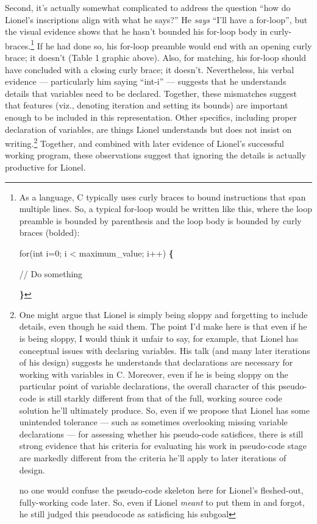 Second, it's actually somewhat complicated to address the question ``how
do Lionel's inscriptions align with what he says?'' He \emph{says}
``I'll have a for-loop'', but the visual evidence shows that he hasn't
bounded his for-loop body in curly-braces.\footnote{As a language, C
  typically uses curly braces to bound instructions that span multiple
  lines. So, a typical for-loop would be written like this, where the
  loop preamble is bounded by parenthesis and the loop body is bounded
  by curly braces (bolded):

  for(int i=0; i \textless{} maximum\_value; i++) \textbf{\{}

  // Do something

  \textbf{\}}} If he had done so, his for-loop preamble would end with
an opening curly brace; it doesn't (Table 1 graphic above). Also, for
matching, his for-loop should have concluded with a closing curly brace;
it doesn't. Nevertheless, his verbal evidence --- particularly him
saying ``int-i'' --- suggests that he understands details that variables
need to be declared. Together, these mismatches suggest that features
(viz., denoting iteration and setting its bounds) are important enough
to be included in this representation. Other specifics, including proper
declaration of variables, are things Lionel understands but does not
insist on writing.\footnote{One might argue that Lionel is simply being
  sloppy and forgetting to include details, even though he said them.
  The point I'd make here is that even if he is being sloppy, I would
  think it unfair to say, for example, that Lionel has conceptual issues
  with declaring variables. His talk (and many later iterations of his
  design) suggests he understands that declarations are necessary for
  working with variables in C. Moreover, even if he is being sloppy on
  the particular point of variable declarations, the overall character
  of this pseudo-code is still starkly different from that of the full,
  working source code solution he'll ultimately produce. So, even if we
  propose that Lionel has some unintended tolerance --- such as
  sometimes overlooking missing variable declarations --- for assessing
  whether his pseudo-code satisfices, there is still strong evidence
  that his criteria for evaluating his work in pseudo-code stage are
  markedly different from the criteria he'll apply to later iterations
  of design.

  no one would confuse the pseudo-code skeleton here for Lionel's
  fleshed-out, fully-working code later. So, even if Lionel \emph{meant}
  to put them in and forgot, he still judged this pseudocode as
  satisficing his subgoal} Together, and combined with later evidence of
Lionel's successful working program, these observations suggest that
ignoring the details is actually productive for Lionel.

